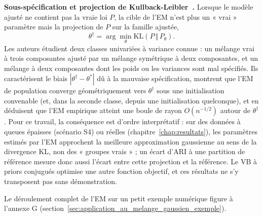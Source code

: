 \textbf{Sous-spécification et projection de Kullback-Leibler~\cite{dwivedi2018}.} Lorsque le modèle ajusté ne contient pas la vraie loi $P$, la cible de l'EM n'est plus un « vrai » paramètre mais la projection de $P$ sur la famille ajustée,
\begin{equation*}
\theta^\dagger = \arg\min_{\theta} \mathrm{KL}(P \,\Vert\, P_\theta).
\end{equation*}
Les auteurs étudient deux classes univariées à variance connue : un mélange vrai à trois composantes ajusté par un mélange symétrique à deux composantes, et un mélange à deux composantes dont les poids ou les variances sont mal spécifiés. Ils caractérisent le biais $|\theta^\dagger - \theta^*|$ dû à la mauvaise spécification, montrent que l'EM de population converge géométriquement vers $\theta^\dagger$ sous une initialisation convenable (et, dans la seconde classe, depuis une initialisation quelconque), et en déduisent que l'EM empirique atteint une boule de rayon $O(n^{-1/2})$ autour de $\theta^\dagger$. Pour ce travail, la conséquence est d'ordre interprétatif : sur des données à queues épaisses (scénario S4) ou réelles (chapitre~\ref{chap:resultats}), les paramètres estimés par l'EM approchent la meilleure approximation gaussienne au sens de la divergence KL, non des « groupes vrais » ; un écart d'ARI à une partition de référence mesure donc aussi l'écart entre cette projection et la référence. Le VB à priors conjugués optimise une autre fonction objectif, et ces résultats ne s'y transposent pas sans démonstration.

Le déroulement complet de l'EM sur un petit exemple numérique figure à l'annexe G (section~\ref{sec:application_au_melange_gaussien_exemple}).

